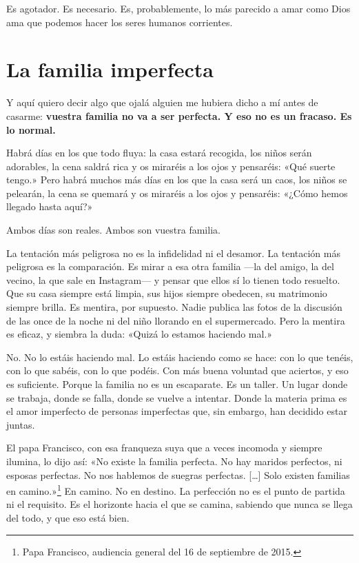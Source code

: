 Es agotador. Es necesario. Es, probablemente, lo más parecido a amar como Dios ama que podemos hacer los seres humanos corrientes.

\section{La familia imperfecta}

Y aquí quiero decir algo que ojalá alguien me hubiera dicho a mí antes de casarme: \textbf{vuestra familia no va a ser perfecta. Y eso no es un fracaso. Es lo normal.}

Habrá días en los que todo fluya: la casa estará recogida, los niños serán adorables, la cena saldrá rica y os miraréis a los ojos y pensaréis: «Qué suerte tengo.» Pero habrá muchos más días en los que la casa será un caos, los niños se pelearán, la cena se quemará y os miraréis a los ojos y pensaréis: «¿Cómo hemos llegado hasta aquí?»

Ambos días son reales. Ambos son vuestra familia.

La tentación más peligrosa no es la infidelidad ni el desamor. La tentación más peligrosa es la comparación. Es mirar a esa otra familia ---la del amigo, la del vecino, la que sale en Instagram--- y pensar que ellos sí lo tienen todo resuelto. Que su casa siempre está limpia, sus hijos siempre obedecen, su matrimonio siempre brilla. Es mentira, por supuesto. Nadie publica las fotos de la discusión de las once de la noche ni del niño llorando en el supermercado. Pero la mentira es eficaz, y siembra la duda: «Quizá lo estamos haciendo mal.»

No. No lo estáis haciendo mal. Lo estáis haciendo como se hace: con lo que tenéis, con lo que sabéis, con lo que podéis. Con más buena voluntad que aciertos, y eso es suficiente. Porque la familia no es un escaparate. Es un taller. Un lugar donde se trabaja, donde se falla, donde se vuelve a intentar. Donde la materia prima es el amor imperfecto de personas imperfectas que, sin embargo, han decidido estar juntas.

El papa Francisco, con esa franqueza suya que a veces incomoda y siempre ilumina, lo dijo así: «No existe la familia perfecta. No hay maridos perfectos, ni esposas perfectas. No nos hablemos de suegras perfectas. [\ldots] Solo existen familias en camino.»\footnote{Papa Francisco, audiencia general del 16 de septiembre de 2015.} En camino. No en destino. La perfección no es el punto de partida ni el requisito. Es el horizonte hacia el que se camina, sabiendo que nunca se llega del todo, y que eso está bien.

